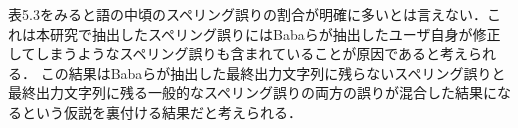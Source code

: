 表5.3をみると語の中頃のスペリング誤りの割合が明確に多いとは言えない．これは本研究で抽出したスペリング誤りにはBabaらが抽出したユーザ自身が修正してしまうようなスペリング誤り\cite{babaACL2012}も含まれていることが原因であると考えられる．
この結果はBabaらが抽出した最終出力文字列に残らないスペリング誤りと最終出力文字列に残る一般的なスペリング誤りの両方の誤りが混合した結果になるという仮説を裏付ける結果だと考えられる．

\begin{comment}
表5.4には英単語の長さに応じた単語内のスペリング誤りの位置の割合を示している．表5.4から英単語の長さが長くなるに応じて語頭と語尾の文字に対するスペリング誤りの割合が減っていることがわかる．
\end{comment}

\begin{comment}
\subsubsection{スペリング誤りの割合}
表7にそれぞれの観点での分析におけるスペリング誤りの割合を示す．この結果からタイピングゲームのような通常より素早くタイピングを行ったり，文字を書き写すような状況ではキーボードのキー配置が近いことが原因で起きる打鍵誤りや入力すべき文字を飛ばしてしまう誤りが起きることがわかった．また単語の語頭や語末でのスペリング誤りの割合は表7に示す．
\end{comment}

\begin{comment}
\subsubsection{同じ文字が連続している文字列に対するスペリング誤り}
\end{comment}

\begin{comment}
\subsubsection{アルファベットに対する数字のスペリング誤り}
表5.1にはその事例を示していて，ユーザがタイピングゲームにおいて英単語ideaを入力するときにユーザが入力した文字列が13ideaであった場合があった．これはそれぞれiと1，dと3の視覚的混同によって起きたものであると考えられる．しかし英単語を入力するという設定のタイピングゲームにおいて，数字を入力することは考えにくい．しかしタイピングゲームではハイスコアを競う設定がされているので，競うようなユーザが焦るような状況においては，視覚的混同のようなスペリング誤りを引き起こす要因が高まると考えられる．
\end{comment}

